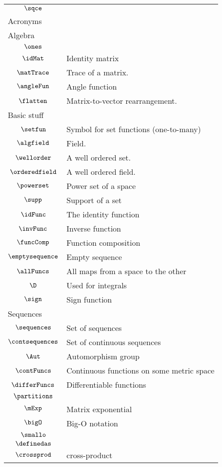 \begin{longtable}{cl}
 $\sqce$ & \\ 
 \multicolumn{2}{l}{Acronyms}\\ 
 \hline
\multicolumn{2}{l}{Algebra}\\ 
 \hline
$\ones$ & \\ 
 $\idMat$ &  Identity matrix\\ 
 $\matTrace$ &  Trace of a matrix.\\ 
 $\angleFun$ &  Angle function\\ 
 $\flatten$ &  Matrix-to-vector rearrangement.\\ 
 \multicolumn{2}{l}{Basic stuff}\\ 
 \hline
$\setfun$ &  Symbol for set functions (one-to-many)\\ 
 $\algfield$ &  Field.\\ 
 $\wellorder$ &  A well ordered set.\\ 
 $\orderedfield$ &  A well ordered field.\\ 
 $\powerset$ &  Power set of a space\\ 
 $\supp$ &  Support of a set\\ 
 $\idFunc$ &  The identity function\\ 
 $\invFunc$ &  Inverse function \\ 
 $\funcComp$ &  Function composition\\ 
 $\emptysequence$ &  Empty sequence\\ 
 $\allFuncs$ &  All maps from a space to the other\\ 
 $\D$ &  Used for integrals\\ 
 $\sign$ &  Sign function\\ 
 \multicolumn{2}{l}{Sequences}\\ 
 \hline
$\sequences$ &  Set of sequences\\ 
 $\contsequences$ &  Set of continuous sequences\\ 
 $\Aut$ &  Automorphism group\\ 
 $\contFuncs$ &  Continuous functions on some metric space \\ 
 $\differFuncs$ &  Differentiable functions\\ 
 $\partitions$ & \\ 
 $\mExp$ &  Matrix exponential\\ 
 $\bigO$ &  Big-O notation\\ 
 $\smallo$ & \\ 
 $\definedas$ & \\ 
 $\crossprod$ &  cross-product\\ 

\end{longtable}
